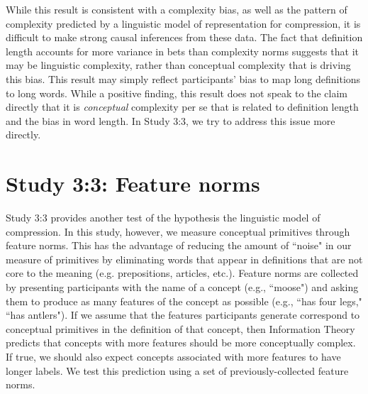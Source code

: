 While this result is consistent with a complexity bias, as well as the pattern of complexity predicted by a linguistic model of representation for compression, it is difficult to make strong causal inferences from these data. The fact that definition length accounts for more variance in bets than complexity norms suggests that it may be linguistic complexity, rather than conceptual complexity that is driving this bias. This result may simply reflect participants' bias to map long definitions to long words. While a positive finding, this result does not speak to the claim directly that it is {\it conceptual} complexity per se that is related to definition length and the bias in word length. In Study 3:3, we try to address this issue more directly. 

\section{Study 3:3: Feature norms}
Study 3:3 provides another test of the hypothesis the linguistic model of compression. In this study, however, we measure conceptual primitives through feature norms. This has the advantage of reducing the amount of ``noise" in our measure of primitives by eliminating words that appear in definitions that are not core to the meaning (e.g. prepositions, articles, etc.). Feature norms are collected by presenting participants with the name of a concept (e.g., ``moose") and asking them to produce as many features of the concept as possible (e.g., ``has four legs," ``has antlers"). If we assume that the features participants generate correspond to conceptual primitives in the definition of that concept, then Information Theory predicts that concepts with more  features should be more conceptually complex. If true, we should also expect concepts associated with more features to have longer labels. We test this prediction using a set of previously-collected feature norms.

